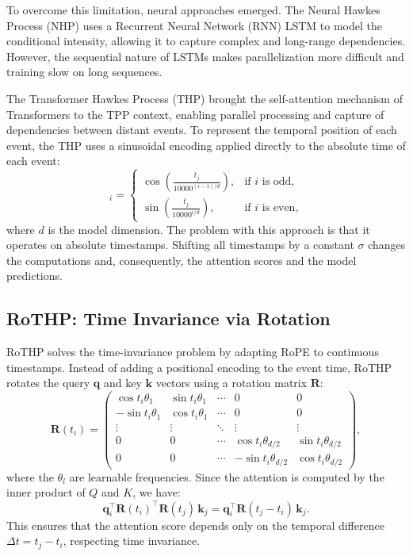\documentclass[runningheads]{llncs}
\begin{document}
To overcome this limitation, neural approaches emerged. The Neural Hawkes Process (NHP) \cite{mei2017neural} uses a Recurrent Neural Network (RNN) LSTM to model the conditional intensity, allowing it to capture complex and long-range dependencies. However, the sequential nature of LSTMs makes  parallelization more difficult and training slow on long sequences.

The Transformer Hawkes Process (THP) \cite{zuo2020transformer} brought the self-attention mechanism of Transformers to the TPP context, enabling parallel processing and capture of dependencies between distant events. To represent the temporal position of each event, the THP uses a sinusoidal encoding applied directly to the absolute time of each event:
%
\begin{equation}
[\bm{z}(t_j)]_i =
\begin{cases}
\cos\!\left(\frac{t_j}{10000^{(i-1)/d}}\right), & \text{if } i \text{ is odd,} \\[4pt]
\sin\!\left(\frac{t_j}{10000^{i/d}}\right), & \text{if } i \text{ is even,}
\end{cases}
\end{equation}
%
where $d$ is the model dimension. The problem with this approach is that it operates on absolute timestamps. Shifting all timestamps by a constant $\sigma$ changes the computations and, consequently, the attention scores and the model predictions.

\subsection{RoTHP: Time Invariance via Rotation}

RoTHP \cite{dai2026rothp} solves the time-invariance problem by adapting RoPE \cite{su2024roformer} to continuous timestamps. Instead of adding a positional encoding to the event time, RoTHP rotates the query $\bm{q}$ and key $\bm{k}$ vectors using a rotation matrix $\bm{R}$:
%
\begin{equation}
\bm{R}(t_i) =
\begin{pmatrix}
\cos t_i\theta_1 & \sin t_i\theta_1 & \cdots & 0 & 0 \\
-\sin t_i\theta_1 & \cos t_i\theta_1 & \cdots & 0 & 0 \\
\vdots & \vdots & \ddots & \vdots & \vdots \\
0 & 0 & \cdots & \cos t_i\theta_{d/2} & \sin t_i\theta_{d/2} \\
0 & 0 & \cdots & -\sin t_i\theta_{d/2} & \cos t_i\theta_{d/2}
\end{pmatrix},
\end{equation}
%
where the $\theta_l$ are learnable frequencies. Since the attention is computed by the inner product of $Q$ and $K$, we have:
%
\begin{equation}
\bm{q}_i^\top \bm{R}(t_i)^\top \bm{R}(t_j) \, \bm{k}_j = \bm{q}_i^\top \bm{R}(t_j - t_i) \, \bm{k}_j.
\end{equation}
%
This ensures that the attention score depends only on the temporal difference $\Delta t = t_j - t_i$, respecting time invariance.
\end{document}

